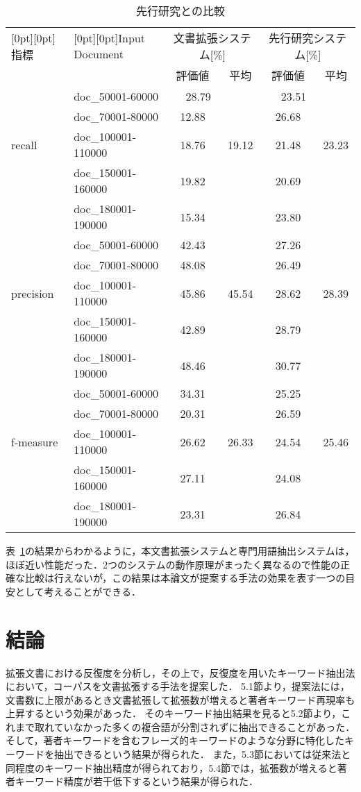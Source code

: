 \documentclass[japanese]{jnlp_1.2c}
\begin{document}
\begin{table}[t]
	\centering
	\caption{先行研究との比較}
	\begin{tabular}{l|l|c|c|c|c}
	\raisebox{-1.8ex}[0pt][0pt]{指標} & \raisebox{-1.8ex}[0pt][0pt]{Input Document} & \multicolumn{2}{c|}{文書拡張システム[\%]} & \multicolumn{2}{c}{先行研究システム[\%]} \\
	\cline{3-6}
	 & & \multicolumn{1}{c|}{評価値} & \multicolumn{1}{|c|}{平均} & \multicolumn{1}{c|}{評価値} & \multicolumn{1}{|c}{平均} \\
	\hline
		 & doc\_50001-60000 & 　28.79　 & & 　23.51　 & \\
		 & doc\_70001-80000 & 12.88 & & 26.68 & \\
		recall & doc\_100001-110000 & 18.76 & 19.12 & 21.48 & 23.23 \\
		 & doc\_150001-160000 & 19.82 & & 20.69 & \\
		 & doc\_180001-190000 & 15.34 & & 23.80 \\ \hline
		 & doc\_50001-60000 & 42.43 & & 27.26 & \\
		 & doc\_70001-80000 & 48.08 & & 26.49 & \\
	precision & doc\_100001-110000 & 45.86 & 45.54 & 28.62 & 28.39 \\
		 & doc\_150001-160000 & 42.89 & & 28.79 & \\
		 & doc\_180001-190000 & 48.46 & & 30.77 & \\ \hline
		 & doc\_50001-60000 & 34.31 & & 25.25 & \\
		 & doc\_70001-80000 & 20.31 & & 26.59 & \\
		f-measure & doc\_100001-110000 & 26.62 & 26.33 & 24.54 & 25.46 \\
		 & doc\_150001-160000 & 27.11 & & 24.08 & \\
		 & doc\_180001-190000 & 23.31 & & 26.84 & \\
	\end{tabular}
	\label{tab:research}
\end{table}

表~\ref{tab:research}の結果からわかるように，本文書拡張システムと専門用語抽出システムは，ほぼ近い性能だった．2つのシステムの動作原理がまったく異なるので性能の正確な比較は行えないが，この結果は本論文が提案する手法の効果を表す一つの目安として考えることができる．

\section{結論}
拡張文書における反復度を分析し，その上で，反復度を用いたキーワード抽出法において，コーパスを文書拡張する手法を提案した．
5.1節より，提案法には，文書数に上限があるとき文書拡張して拡張数が増えると著者キーワード再現率も上昇するという効果があった．
そのキーワード抽出結果を見ると5.2節より，これまで取れていなかった多くの複合語が分割されずに抽出できることがあった．
そして，著者キーワードを含むフレーズ的キーワードのような分野に特化したキーワードを抽出できるという結果が得られた．
また，5.3節においては従来法と同程度のキーワード抽出精度が得られており，5.4節では，拡張数が増えると著者キーワード精度が若干低下するという結果が得られた．
\end{document}
